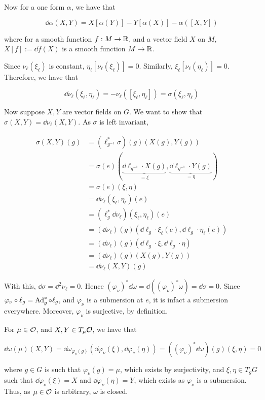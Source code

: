 \documentclass{article}
\begin{document}
Now for a one form \(\alpha\), we have that

\[\dd\alpha(X, Y) = X[\alpha(Y)] - Y[\alpha(X)] - \alpha([X, Y])\]

where for a smooth function \(f : M \to \mathbb{R}\), and a vector field \(X\) on \(M\), \(X[f] := \dd f(X)\) is a smooth function \(M \to \mathbb{R}\).

Since \(\nu_\ell(\xi_\ell)\) is constant, \(\eta_\ell[\nu_\ell(\xi_\ell)] = 0\). Similarly, \(\xi_\ell[\nu_\ell(\eta_\ell)] = 0\). Therefore, we have that

\[\dd \nu_\ell(\xi_\ell, \eta_\ell) = -\nu_\ell([\xi_\ell, \eta_\ell]) = \sigma(\xi_\ell, \eta_\ell)\]

Now suppose \(X, Y\) are vector fields on \(G\). We want to show that \(\sigma(X, Y) = \dd\nu_\ell(X, Y)\). As \(\sigma\) is left invariant,

\begin{align*}
    \sigma(X, Y)(g) &= (\ell_{g^{-1}}^* \sigma)(g)(X(g), Y(g)) \\
    &= \sigma(e)(\underbrace{\dd \ell_{g^{-1}} \cdot X(g)}_{=\xi}, \underbrace{\dd \ell_{g^{-1}} \cdot Y(g)}_{=\eta}) \\
    &= \sigma(e)(\xi, \eta) \\
    &= \dd\nu_\ell(\xi_\ell, \eta_\ell)(e) \\
    &= (\ell_g^*\dd\nu_\ell)(\xi_\ell, \eta_\ell)(e) \\
    &= (\dd\nu_\ell)(g)(\dd\ell_g\cdot \xi_\ell(e), \dd\ell_g\cdot\eta_\ell(e)) \\
    &= (\dd\nu_\ell)(g)(\dd \ell_g\cdot \xi, \dd\ell_g\cdot \eta) \\
    &= (\dd\nu_\ell)(g)(X(g), Y(g)) \\
    &= \dd\nu_\ell(X, Y)(g)
\end{align*}

With this, \(\dd\sigma = \dd^2\nu_\ell = 0\). Hence \((\varphi_\nu)^*\dd\omega = \dd((\varphi_\nu)^*\omega) = \dd\sigma = 0\). Since \(\varphi_\nu \circ \ell_g = \operatorname{Ad}_g^* \circ \ell_g\), and \(\varphi_\nu\) is a submersion at \(e\), it is infact a submersion everywhere. Moreover, \(\varphi_\nu\) is surjective, by definition.

For \(\mu \in \mathcal{O}\), and \(X, Y \in T_\mu \mathcal{O}\), we have that

\[\dd\omega(\mu)(X, Y) = \dd\omega_{\varphi_\nu(g)}(\dd\varphi_\nu(\xi), \dd\varphi_\nu(\eta)) = ((\varphi_\nu)^*\dd\omega)(g)(\xi, \eta) = 0\]

where \(g \in G\) is such that \(\varphi_\nu(g) = \mu\), which exists by surjectivity, and \(\xi, \eta \in T_gG\) such that \(\dd\varphi_\nu(\xi) = X\) and \(\dd\varphi_\nu(\eta) = Y\), which exists as \(\varphi_\nu\) is a submersion. Thus, as \(\mu \in \mathcal{O}\) is arbitrary, \(\omega\) is closed.
\end{document}
